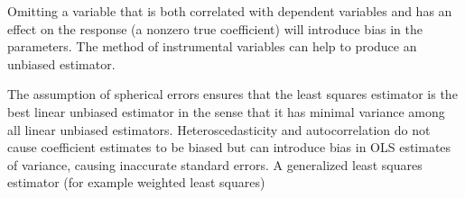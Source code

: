 Omitting a variable that is both correlated with dependent variables and has an effect on the response (a nonzero true coefficient) will introduce bias in the parameters. The method of instrumental variables can help to produce an unbiased estimator.

The assumption of spherical errors ensures that the least squares estimator is the best linear unbiased estimator in the sense that it has minimal variance among all linear unbiased estimators. Heteroscedasticity and autocorrelation do not cause coefficient estimates to be biased but can introduce bias in OLS estimates of variance, causing inaccurate standard errors. A generalized least squares estimator (for example weighted least squares) 
